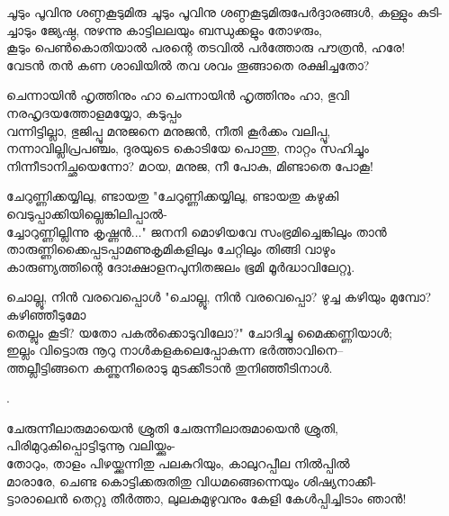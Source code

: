 \begin{enumerate}

\begin{slokam}{\VSv}{\VKG}{ചൂടും പൂവിനു ശണ്ഠകൂടുമിരു}
ചൂടും പൂവിനു ശണ്ഠകൂടുമിരുപേർദ്ദാരങ്ങള്‍, കള്ളും കുടി-\\
ച്ചാടും ജ്യേഷ്ഠ, നുഴന്നു കാട്ടിലലയും ബന്ധുക്കളും തോഴരും,\\
കൂടും പെൺകൊതിയാൽ പരന്റെ തടവിൽ പർത്തോരു പൗത്രൻ, ഹരേ!\\
വേടൻ തൻ കണ ശാഖിയിൽ തവ ശവം തൂങ്ങാതെ രക്ഷിച്ചതോ?
\end{slokam}



\begin{slokam}{\VSr}{\CKP}{ചെന്നായിൻ ഹൃത്തിനും ഹാ}
ചെന്നായിൻ ഹൃത്തിനും ഹാ, ഭുവി നരഹൃദയത്തോളമയ്യോ, കടുപ്പം\\
വന്നിട്ടില്ലാ, ഭുജിപ്പൂ മനുജനെ മനുജൻ, നീതി കൂർക്കം വലിപ്പൂ,\\
നന്നാവില്ലിപ്രപഞ്ചം, ദുരയുടെ കൊടിയേ പൊന്തു, നാറ്റം സഹിച്ചും\\
നിന്നീടാനിച്ഛയെന്നോ? മഠയ, മനുജ, നീ പോകു, മിണ്ടാതെ പോകൂ!
\end{slokam}


\begin{slokam}{\VSr}{\VKG}{ചേറുണ്ണിക്കയ്യിലു, ണ്ടായതു}
"ചേറുണ്ണിക്കയ്യിലു, ണ്ടായതു കഴുകി വെടുപ്പാക്കിയില്ലെങ്കിലിപ്പാൽ-\\
ച്ചോറുണ്ണില്ലിന്നു കൃഷ്ണൻ..." ജനനി മൊഴിയവേ സംഭ്രമിച്ചെങ്കിലും താൻ \\
താരുണ്ണിക്കൈപ്പടപ്പാമണുകൃമികളിലും ചേറ്റിലും തിങ്ങി വാഴും \\
കാരുണ്യത്തിന്റെ ദോഃക്ഷാളനപുനിതജലം ഭൂമി മൂർദ്ധാവിലേറ്റൂ. 
\end{slokam}



\begin{slokam}{\VSv}{\UN}{ചൊല്ലൂ, നിൻ വരവെപ്പൊൾ}
  "ചൊല്ലൂ, നിൻ വരവെപ്പൊ? ഴുച്ച കഴിയും മുമ്പോ? കഴിഞ്ഞീടുമോ\\
  തെല്ലും കൂടി? യതോ പകൽക്കൊടുവിലോ?" ചോദിച്ചു മൈക്കണ്ണിയാൾ;\\
  ഇല്ലം വിട്ടൊരു നൂറു നാൾകളകലെപ്പോകുന്ന ഭർത്താവിനെ--\\
  ത്തല്ലീട്ടിങ്ങനെ കണ്ണുനീരൊടു മുടക്കീടാൻ തുനിഞ്ഞീടിനാൾ.
\end{slokam}
  

. 


\begin{slokam}{\VSr}{\Unk}{ചേരുന്നീലാരുമായെൻ ശ്രുതി}
ചേരുന്നീലാരുമായെൻ ശ്രുതി, പിരിമുറുകിപ്പൊട്ടിടുന്നൂ വലിയ്ക്കും-\\
തോറും, താളം പിഴയ്ക്കുന്നിതു പലകുറിയും, കാലുറപ്പീല നിൽപ്പിൽ\\
മാരാരേ, ചെണ്ട കൊട്ടിക്കരുതിതു വിധമങ്ങെന്നെയും ശിഷ്യനാക്കീ-\\
ട്ടാരാലെൻ തെറ്റു തീർത്താ, ലുലകുമുഴുവനും കേളി കേള്‍പ്പിച്ചിടാം ഞാൻ!
\end{slokam}


\end{enumerate}
